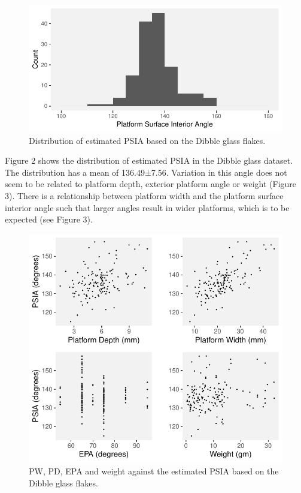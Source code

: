 \documentclass[10pt,letterpaper]{article}
\begin{document}
\begin{figure}
\centering
\includegraphics{PSIA_Manuscript_files/figure-latex/fig2-test_1_angles-1.pdf}
\caption{Distribution of estimated PSIA based on the Dibble glass
flakes.}
\end{figure}

Figure 2 shows the distribution of estimated PSIA in the Dibble glass
dataset. The distribution has a mean of 136.49±7.56. Variation in this
angle does not seem to be related to platform depth, exterior platform
angle or weight (Figure 3). There is a relationship between platform
width and the platform surface interior angle such that larger angles
result in wider platforms, which is to be expected (see Figure 3).

\begin{figure}
\centering
\includegraphics{PSIA_Manuscript_files/figure-latex/fig3-angles_to_other_measures-1.pdf}
\caption{PW, PD, EPA and weight against the estimated PSIA based on the
Dibble glass flakes.}
\end{figure}
\end{document}
